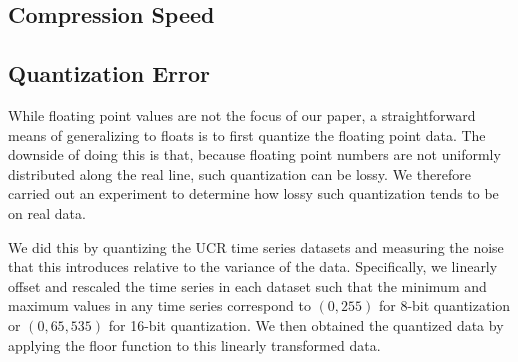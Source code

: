 \subsection{Compression Speed}





\subsection{Quantization Error}


While floating point values are not the focus of our paper, a straightforward means of generalizing \minesp to floats is to first quantize the floating point data. The downside of doing this is that, because floating point numbers are not uniformly distributed along the real line, such quantization can be lossy. We therefore carried out an experiment to determine how lossy such quantization tends to be on real data.

We did this by quantizing the UCR time series datasets and measuring the noise that this introduces relative to the variance of the data. Specifically, we linearly offset and rescaled the time series in each dataset such that the minimum and maximum values in any time series correspond to $(0, 255)$ for 8-bit quantization or $(0, 65,535)$ for 16-bit quantization. We then obtained the quantized data by applying the floor function to this linearly transformed data.

